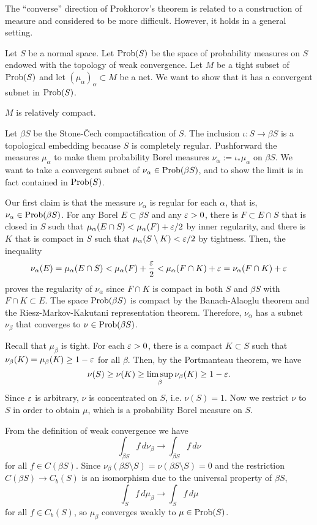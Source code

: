 \documentclass{../note}
\begin{document}
\begin{prb}
The ``converse'' direction of Prokhorov's theorem is related to a construction of measure and considered to be more difficult.
However, it holds in a general setting.

Let $S$ be a normal space.
Let $\operatorname{Prob}(S)$ be the space of probability measures on $S$ endowed with the topology of weak convergence.
Let $M$ be a tight subset of $\operatorname{Prob}(S)$ and let $(\mu_\alpha)_\alpha\subset M$ be a net.
We want to show that it has a convergent subnet in $\operatorname{Prob}(S)$.
\begin{parts}
\item $M$ is relatively compact.
\end{parts}
\end{prb}
\begin{pf}
Let $\beta S$ be the Stone-\v Cech compactification of $S$.
The inclusion $\iota:S\to\beta S$ is a topological embedding because $S$ is completely regular.
Pushforward the measures $\mu_\alpha$ to make them probability Borel measures $\nu_\alpha:=\iota_*\mu_\alpha$ on $\beta S$.
We want to take a convergent subnet of $\nu_\alpha\in\operatorname{Prob}(\beta S)$, and to show the limit is in fact contained in $\operatorname{Prob}(S)$.

Our first claim is that the measure $\nu_\alpha$ is regular for each $\alpha$, that is, $\nu_\alpha\in\operatorname{Prob}(\beta S)$.
For any Borel $E\subset\beta S$ and any $\varepsilon>0$, there is $F\subset E\cap S$ that is closed in $S$ such that $\mu_\alpha(E\cap S)<\mu_\alpha(F)+\varepsilon/2$ by inner regularity, and there is $K$ that is compact in $S$ such that $\mu_\alpha(S\setminus K)<\varepsilon/2$ by tightness.
Then, the inequality
\[\nu_\alpha(E)=\mu_\alpha(E\cap S)<\mu_\alpha(F)+\frac{\varepsilon}2<\mu_\alpha(F\cap K)+\varepsilon=\nu_\alpha(F\cap K)+\varepsilon\]
proves the regularity of $\nu_\alpha$ since $F\cap K$ is compact in both $S$ and $\beta S$ with $F\cap K\subset E$.
The space $\operatorname{Prob}(\beta S)$ is compact by the Banach-Alaoglu theorem and the Riesz-Markov-Kakutani representation theorem.
Therefore, $\nu_\alpha$ has a subnet $\nu_\beta$ that converges to $\nu\in\operatorname{Prob}(\beta S)$.

Recall that $\mu_\beta$ is tight.
For each $\varepsilon>0$, there is a compact $K\subset S$ such that $\nu_\beta(K)=\mu_\beta(K)\ge1-\varepsilon$ for all $\beta$.
Then, by the Portmanteau theorem, we have
\[\nu(S)\ge\nu(K)\ge\limsup_\beta\nu_\beta(K)\ge1-\varepsilon.\]
Since $\varepsilon$ is arbitrary, $\nu$ is concentrated on $S$, i.e. $\nu(S)=1$.
Now we restrict $\nu$ to $S$ in order to obtain $\mu$, which is a probability Borel measure on $S$.

From the definition of weak convergence we have
\[\int_{\beta S}f\,d\nu_\beta\to\int_{\beta S}f\,d\nu\]
for all $f\in C(\beta S)$.
Since $\nu_\beta(\beta S\setminus S)=\nu(\beta S\setminus S)=0$ and the restriction $C(\beta S)\to C_b(S)$ is an isomorphism due to the universal property of $\beta S$,
\[\int_Sf\,d\mu_\beta\to\int_Sf\,d\mu\]
for all $f\in C_b(S)$, so $\mu_\beta$ converges weakly to $\mu\in\operatorname{Prob}(S)$.
\end{pf}
\end{document}
